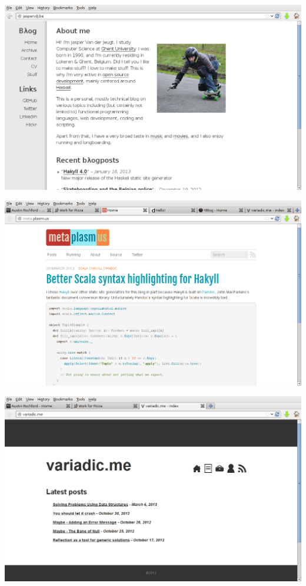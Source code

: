 \documentclass[20pt]{beamer}
\begin{document}
\begin{frame}[plain]
    \includegraphics[width=\textwidth]{../2013-odhac-hakyll/images/example-jaspervdj.png}
\end{frame}

\begin{frame}[plain]
    \includegraphics[width=\textwidth]{../2013-odhac-hakyll/images/example-metaplasm.png}
\end{frame}

\begin{frame}[plain]
    \includegraphics[width=\textwidth]{../2013-odhac-hakyll/images/example-variadic.png}
\end{frame}
\end{document}
